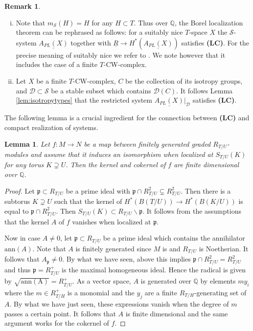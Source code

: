 \documentclass[12pt,a4paper]{article}
\newtheorem{lem}[thm]{Lemma}
\theoremstyle{definition}
\newtheorem{rem}[thm]{Remark}
\begin{document}
\begin{rem}\label{rem:localization}
\begin{enumerate}[(i)]
\item Note that $m_\mathcal{S}(H)=H$ for any $H\subset T$. Thus over $\mathbb{Q}$, the Borel localization theorem can be rephrased as follows: for a {suitably nice} $T$-space $X$ the $\mathcal{S}$-system $\underline{A_{PL}(X)}$ together with $\underline{R}\rightarrow H^*(\underline{A_{PL}(X)})$ satisfies \textbf{(LC)}. For the precise meaning of suitably nice we refer to \cite[Theorem 3.2.6]{AP}. We note however that it includes the case of a finite $T$-CW-complex.

\item Let $X$ be a finite $T$-CW-complex, $C$ be the collection of its isotropy groups, and $\mathcal{D}\subset \mathcal{S}$ be a stable subset which contains $\mathcal{D}(C)$. It follows Lemma \ref{lem:isotropytypes} that the restricted system $\underline{A_{PL}(X)}|_{\mathcal{D}}$ satisfies \textbf{(LC)}.
\end{enumerate}
\end{rem}


The following lemma is a crucial ingredient for the connection between \textbf{(LC)} and compact realization of systems.

\begin{lem}\label{lem:localizationfinite}
Let $f\colon M\rightarrow N$ be a map between finitely generated graded $R_{T/U}$-modules and assume that it induces an isomorphism when localized at $S_{T/U}(K)$ for any torus $K\supsetneq U$. Then the kernel and cokernel of $f$ are finite dimensional over $\mathbb{Q}$.
\end{lem}

\begin{proof}
Let $\mathfrak{p}\subset R_{T/U}$ be a prime ideal with $\mathfrak{p}\cap R^2_{T/U}\subsetneq R^2_{T/U}$.  Then there is a subtorus $K\supsetneq U$ such that the kernel of $H^*(B(T/U))\rightarrow H^*(B(K/U))$ is equal to $\mathfrak{p}\cap R^2_{T/U}$. Then $S_{T/U}(K)\subset R_{T/U}\backslash \mathfrak{p}$. It follows from the assumptions that the kernel $A$ of $f$ vanishes when localized at $\mathfrak{p}$.

Now in case $A\neq 0$, let $\mathfrak{p}\subset R_{T/U}$ be a prime ideal which contains the annihilator $\mathrm{ann}(A)$.
Note that $A$ is finitely generated since $M$ is and $R_{T/U}$ is Noetherian. It follows that $A_\mathfrak{p}\neq 0$.
By what we have seen, above this implies $\mathfrak{p}\cap R^2_{T/U}=R^2_{T/U}$ and thus $\mathfrak{p}=R_{T/U}^+$ is the maximal homogeneous ideal. Hence the radical is given by $\sqrt{\mathrm{ann(A)}}=R^+_{T/U}$. As a vector space, $A$ is generated over $\mathbb{Q}$ by elements $m y_i$ where the $m\in R_{T/H}^+$ is a monomial and the $y_j$ are a finite $R_{T/H}$-generating set of $A$. By what we have just seen, these expressions vanish when the degree of $m$ passes a certain point. It follows that $A$ is finite dimensional and the same argument works for the cokernel of $f$.
\end{proof}
\end{document}
